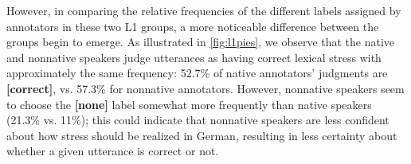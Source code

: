 		

		However, in comparing the relative frequencies of the different labels assigned by annotators in these two L1 groups, a more noticeable difference between the groups begin to emerge. As illustrated in \cref{fig:l1pies}, we observe that the native and nonnative speakers judge utterances as having correct lexical stress with approximately the same frequency: 52.7\% of native annotators' judgments are \textbf{[correct]}, vs. 57.3\% for nonnative annotators. However, nonnative speakers seem to choose the \textbf{[none]}
		label somewhat more frequently than native speakers (21.3\% vs. 11\%); this could indicate that nonnative speakers are less confident about how stress should be realized in German, resulting in less certainty about whether a given utterance is correct or not. 
		
